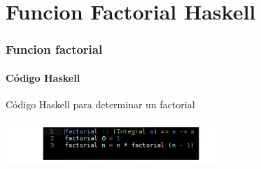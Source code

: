 \documentclass[hyperref={pdfpagelayout=SinglePage}]{beamer} %
\begin{document}
\section{Funcion Factorial Haskell}
\begin{frame}
  \frametitle{Funcion factorial}
  \framesubtitle{Código Haskell}
  \begin{block}{Código Haskell para determinar un factorial}
  \begin{center}
    \includegraphics[width=8cm]{factorial.png}
  \end{center}
                                                
\end{block}
\end{frame}
\end{document}
